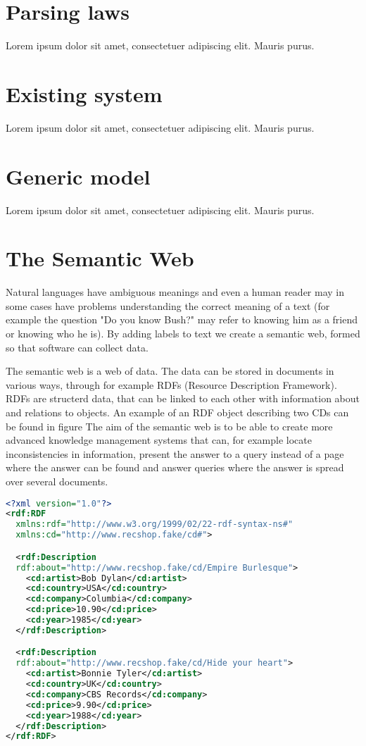 \documentclass[a4paper,11pt]{kth-mag}
\begin{document}
\section{Parsing laws}
Lorem ipsum dolor sit amet, consectetuer adipiscing elit. Mauris
purus. 

\section{Existing system}
Lorem ipsum dolor sit amet, consectetuer adipiscing elit. Mauris
purus. 

\section{Generic model}
Lorem ipsum dolor sit amet, consectetuer adipiscing elit. Mauris
purus. 

\section{The Semantic Web} Natural languages have ambiguous meanings and even
a human reader may in some cases have problems understanding the correct
meaning of a text (for example the question "Do you know Bush?" may refer to
knowing him as a friend or knowing who he is). By adding labels to text we
create a semantic web, formed so that software can collect data.

The semantic web is a web of data. The data can be stored in documents in
various ways, through for example RDFs (Resource Description Framework). RDFs
are structerd data, that can be linked to each other with information about
and relations to objects. An example of an RDF object describing two CDs can
be found in figure The aim of the semantic web is to be able to create more
advanced knowledge management systems that can, for example locate
inconsistencies in information, present the answer to a query instead of a
page where the answer can be found and answer queries where the answer is
spread over several documents.

\begin{lstlisting}[language=xml, caption=An RDF example describing two records, label=rdfexample]
<?xml version="1.0"?>
<rdf:RDF 
  xmlns:rdf="http://www.w3.org/1999/02/22-rdf-syntax-ns#"
  xmlns:cd="http://www.recshop.fake/cd#">

  <rdf:Description
  rdf:about="http://www.recshop.fake/cd/Empire Burlesque">
    <cd:artist>Bob Dylan</cd:artist>
    <cd:country>USA</cd:country>
    <cd:company>Columbia</cd:company>
    <cd:price>10.90</cd:price>
    <cd:year>1985</cd:year>
  </rdf:Description>

  <rdf:Description
  rdf:about="http://www.recshop.fake/cd/Hide your heart">
    <cd:artist>Bonnie Tyler</cd:artist>
    <cd:country>UK</cd:country>
    <cd:company>CBS Records</cd:company>
    <cd:price>9.90</cd:price>
    <cd:year>1988</cd:year>
  </rdf:Description>
</rdf:RDF>
\end{lstlisting}
\end{document}
